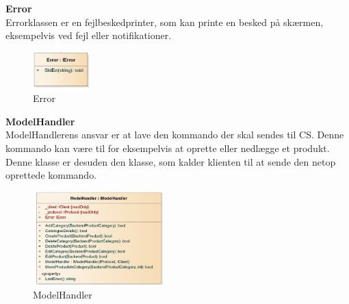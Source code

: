 \textbf{Error}\\
Errorklassen er en fejlbeskedprinter, som kan printe en besked på skærmen, eksempelvis ved fejl eller notifikationer.
\begin{figure}[!h]
    \centering
    \includegraphics[width=0.2\textwidth]{Systemdesign/backend/klassebeskrivelser/Images/Error.png}
    \caption{Error}
    \label{fig:error}
\end{figure}
 \bigskip 
 
 
 
 
 
 
 


\textbf{ModelHandler}\\
ModelHandlerens ansvar er at lave den kommando der skal sendes til \gls{CS}. Denne kommando kan være til for eksempelvis at oprette eller nedlægge et produkt. Denne klasse er desuden den klasse, som kalder klienten til at sende den netop oprettede kommando. 
\begin{center}
\begin{figure}[!h]
    \centering
    \includegraphics[width=0.45\textwidth]{Systemdesign/backend/klassebeskrivelser/Images/ModelHandler.png}
    \caption{ModelHandler}
    \label{fig:modelhandlerreal}
\end{figure}
\end{center}
\label{Modelhandler_Beskrivelse}
 \bigskip
 
 
 
 
 

